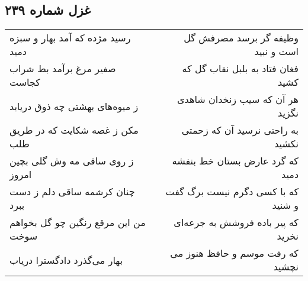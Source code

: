 \begin{center}
\section*{غزل شماره ۲۳۹}
\label{sec:sh239}
\begin{longtable}{l p{0.5cm} r}
رسید مژده که آمد بهار و سبزه دمید
&&
وظیفه گر برسد مصرفش گل است و نبید
\\
صفیر مرغ برآمد بط شراب کجاست
&&
فغان فتاد به بلبل نقاب گل که کشید
\\
ز میوه‌های بهشتی چه ذوق دریابد
&&
هر آن که سیب زنخدان شاهدی نگزید
\\
مکن ز غصه شکایت که در طریق طلب
&&
به راحتی نرسید آن که زحمتی نکشید
\\
ز روی ساقی مه وش گلی بچین امروز
&&
که گرد عارض بستان خط بنفشه دمید
\\
چنان کرشمه ساقی دلم ز دست ببرد
&&
که با کسی دگرم نیست برگ گفت و شنید
\\
من این مرقع رنگین چو گل بخواهم سوخت
&&
که پیر باده فروشش به جرعه‌ای نخرید
\\
بهار می‌گذرد دادگسترا دریاب
&&
که رفت موسم و حافظ هنوز می نچشید
\\
\end{longtable}
\end{center}
